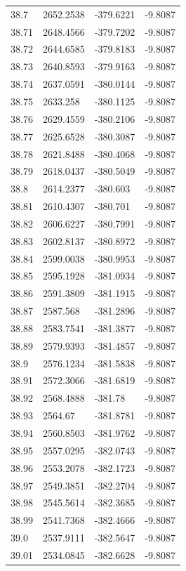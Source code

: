 \begin{table}[H]
\begin{tabular}{llll}
38.7 & 2652.2538 & -379.6221 & -9.8087 \\
38.71 & 2648.4566 & -379.7202 & -9.8087 \\
38.72 & 2644.6585 & -379.8183 & -9.8087 \\
38.73 & 2640.8593 & -379.9163 & -9.8087 \\
38.74 & 2637.0591 & -380.0144 & -9.8087 \\
38.75 & 2633.258 & -380.1125 & -9.8087 \\
38.76 & 2629.4559 & -380.2106 & -9.8087 \\
38.77 & 2625.6528 & -380.3087 & -9.8087 \\
38.78 & 2621.8488 & -380.4068 & -9.8087 \\
38.79 & 2618.0437 & -380.5049 & -9.8087 \\
38.8 & 2614.2377 & -380.603 & -9.8087 \\
38.81 & 2610.4307 & -380.701 & -9.8087 \\
38.82 & 2606.6227 & -380.7991 & -9.8087 \\
38.83 & 2602.8137 & -380.8972 & -9.8087 \\
38.84 & 2599.0038 & -380.9953 & -9.8087 \\
38.85 & 2595.1928 & -381.0934 & -9.8087 \\
38.86 & 2591.3809 & -381.1915 & -9.8087 \\
38.87 & 2587.568 & -381.2896 & -9.8087 \\
38.88 & 2583.7541 & -381.3877 & -9.8087 \\
38.89 & 2579.9393 & -381.4857 & -9.8087 \\
38.9 & 2576.1234 & -381.5838 & -9.8087 \\
38.91 & 2572.3066 & -381.6819 & -9.8087 \\
38.92 & 2568.4888 & -381.78 & -9.8087 \\
38.93 & 2564.67 & -381.8781 & -9.8087 \\
38.94 & 2560.8503 & -381.9762 & -9.8087 \\
38.95 & 2557.0295 & -382.0743 & -9.8087 \\
38.96 & 2553.2078 & -382.1723 & -9.8087 \\
38.97 & 2549.3851 & -382.2704 & -9.8087 \\
38.98 & 2545.5614 & -382.3685 & -9.8087 \\
38.99 & 2541.7368 & -382.4666 & -9.8087 \\
39.0 & 2537.9111 & -382.5647 & -9.8087 \\
39.01 & 2534.0845 & -382.6628 & -9.8087 \\

\end{tabular}
\end{table}
